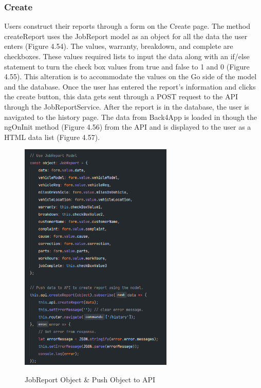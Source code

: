 \subsubsection{Create}
Users construct their reports through a form on the Create page. The method createReport uses the JobReport model as an object for all the data the user enters (Figure 4.54). The values, warranty, breakdown, and complete are checkboxes. These values required lists to input the data along with an if/else statement to turn the check box values from true and false to 1 and 0 (Figure 4.55). This alteration is to accommodate the values on the Go side of the model and the database. Once the user has entered the report's information and clicks the create button, this data gets sent through a POST request to the API through the JobReportService. After the report is in the database, the user is navigated to the history page. The data from Back4App is loaded in though the ngOnInit method (Figure 4.56) from the API and is displayed to the user as a HTML data list (Figure 4.57).  

\begin{figure}[H]
    \centering
    \caption{JobReport Object \& Push Object to API}
    \includegraphics[width=0.65\textwidth]{images/repota/report_pages/create_2.png}
    \label{image:createReportObject}
    \centering
\end{figure}

